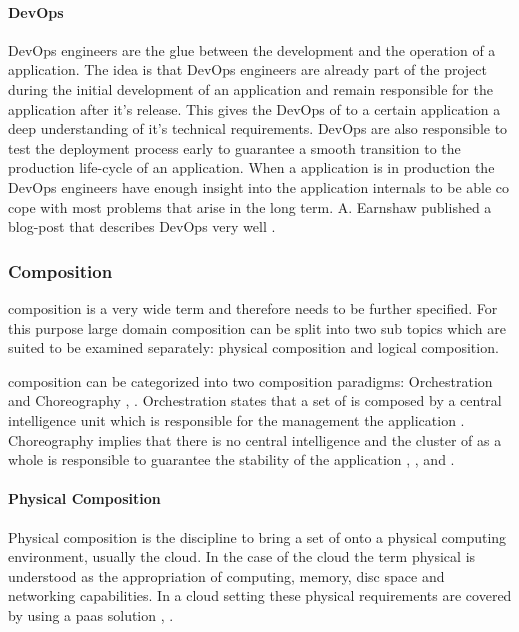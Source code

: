 \paragraph{DevOps}

DevOps engineers are the glue between the development and the operation of a
\ms{} application. The idea is that DevOps engineers are already part of the
project during the initial development of an application and remain responsible
for the application after it's release. This gives the DevOps of to a certain
application a deep understanding of it's technical requirements. DevOps are also
responsible to test the deployment process early to guarantee a smooth
transition to the production life-cycle of an application. When a \ms{}
application is in production the DevOps engineers have enough insight into the
application internals to be able co cope with most problems that arise in the
long term. A. Earnshaw published a blog-post that describes DevOps very
well \cite{earnshaw2013devops}.

\subsubsection{\msuc{} Composition}
\label{subsub:composition}

\msuc{} composition is a very wide term and therefore needs to be further
specified. For this purpose large domain composition can be split into two sub
topics which are suited to be examined separately: physical composition and
logical composition.

\msuc{} composition can be categorized into two composition paradigms:
Orchestration and Choreography \cite{varjoinen2014orchestrationVSchoreography},
\cite{lublinsky2008orchestrationVSchoreography}. Orchestration states that a set
of \mss{} is composed by a central intelligence unit which is responsible for
the management the application \cite{cohen2015orchestration}. Choreography
implies that there is no central intelligence and the cluster of \mss{} as a
whole is responsible to guarantee the stability of the application
\cite{millidge2015choreography}, \cite{vilas2016choreography}, and
\cite{jellema2017choreography}.

\paragraph{Physical Composition}

Physical composition is the discipline to bring a set of \mss{} onto a
physical computing environment, usually the cloud. In the case of the cloud the
term physical is understood as the appropriation of computing, memory, disc
space and networking capabilities. In a cloud setting these physical
requirements are covered by using a \gls{paas} solution
\cite{lawton2008developing}, \cite{buyya2009modeling}.

